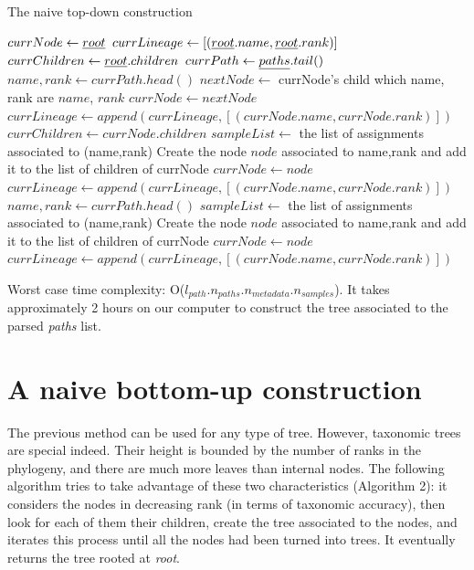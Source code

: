\documentclass{report}
\begin{document}
\begin{algorithm}
\caption{The naive top-down construction}
\begin{algorithmic}
\STATE $currNode \leftarrow \emph{root}$
\STATE $currLineage \leftarrow [ (\emph{root}.name, \emph{root}.rank) ]$
\STATE $currChildren \leftarrow \emph{root}.children$
\STATE $currPath \leftarrow \emph{paths}.tail()$
\STATE $name,rank \leftarrow currPath.head()$
\STATE $nextNode \leftarrow$ currNode's child which name, rank are $name$, $rank$
\STATE $currNode \leftarrow nextNode$ 
\STATE $currLineage \leftarrow append(currLineage,[(currNode.name,currNode.rank)])$
\STATE $currChildren \leftarrow currNode.children$
\ELSE
\STATE $sampleList \leftarrow$ the list of assignments associated to (name,rank)
\STATE Create the node $node$ associated to name,rank and add it to the list of children of currNode
\STATE $currNode \leftarrow node$
\STATE $currLineage \leftarrow append(currLineage,[(currNode.name,currNode.rank)]) $
\STATE $name,rank \leftarrow currPath.head()$
\STATE $sampleList \leftarrow$ the list of assignments associated to (name,rank)
\STATE Create the node $node$ associated to name,rank and add it to the list of children of currNode
\STATE $currNode \leftarrow node$
\STATE $currLineage \leftarrow append(currLineage,[(currNode.name,currNode.rank)]) $
\ENDWHILE
\ENDIF
\ENDWHILE
\ENDFOR
{}
\end{algorithmic}
\end{algorithm}

Worst case time complexity: O($l_{path}.n_{paths}.n_{metadata}.n_{samples}$). It takes approximately 2 hours on our computer to construct the tree associated to the parsed \emph{paths} list.

\section{A naive bottom-up construction}

The previous method can be used for any type of tree. However, taxonomic trees are special indeed. Their height is bounded by the number of ranks in the phylogeny, and there are much more leaves than internal nodes. The following algorithm tries to take advantage of these two characteristics (Algorithm 2): it considers the nodes in decreasing rank (in terms of taxonomic accuracy), then look for each of them their children, create the tree associated to the nodes, and iterates this process until all the nodes had been turned into trees. It eventually returns the tree rooted at \emph{root}.\\
\end{document}
